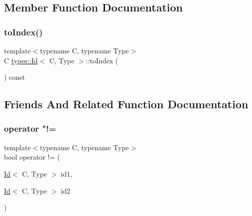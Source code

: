 \subsection{Member Function Documentation}
\mbox{\label{classtypes_1_1_id_a8b4a4ba53dfbfda655ece5e6ea9fbcd5}} 
\subsubsection{\texorpdfstring{toIndex()}{toIndex()}}
{\footnotesize\ttfamily template$<$typename C, typename Type$>$ \\
C \mbox{\hyperlink{classtypes_1_1_id}{types\+::\+Id}}$<$ C, Type $>$\+::to\+Index (\begin{DoxyParamCaption}{ }\end{DoxyParamCaption}) const\hspace{0.3cm}{\ttfamily [inline]}}



\subsection{Friends And Related Function Documentation}
\mbox{\label{classtypes_1_1_id_a66aa311b2a121325030611f6d46e7f71}} 
\subsubsection{\texorpdfstring{operator "!=}{operator !=}}
{\footnotesize\ttfamily template$<$typename C, typename Type$>$ \\
bool operator != (\begin{DoxyParamCaption}\item[{\mbox{\hyperlink{classtypes_1_1_id}{Id}}$<$ C, Type $>$}]{id1,  }\item[{\mbox{\hyperlink{classtypes_1_1_id}{Id}}$<$ C, Type $>$}]{id2 }\end{DoxyParamCaption})\hspace{0.3cm}{\ttfamily [friend]}}

\mbox{\label{classtypes_1_1_id_a1af56b89265288b186667ef10b5803ac}} 
